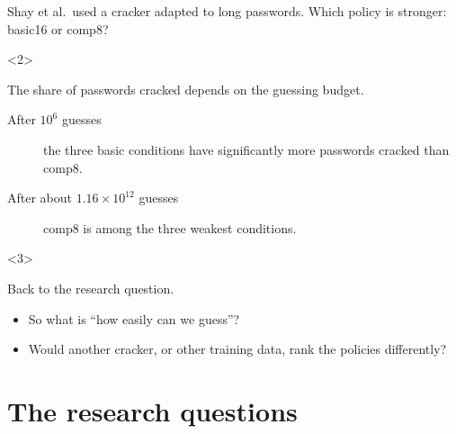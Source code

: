 \begin{frame}
  \begin{question}
    Shay et al.\ used a cracker adapted to long passwords.
    Which policy is stronger: basic16 or comp8?
  \end{question}

  \begin{onlyenv}<2>
    \begin{example}
      The share of passwords cracked depends on the guessing budget.
      \begin{description}
        \item[After $10^6$ guesses] the three basic conditions have
          significantly more passwords cracked than comp8.
        \item[After about $1.16\times 10^{12}$ guesses] comp8 is among the
          three weakest conditions.
      \end{description}
    \end{example}
  \end{onlyenv}

  \begin{onlyenv}<3>
    \begin{question}
      Back to the research question.
      \begin{itemize}
        \item So what is \enquote{how easily can we guess}?
        \item Would another cracker, or other training data, rank the
          policies differently?
      \end{itemize}
    \end{question}
  \end{onlyenv}

\end{frame}

\section{The research questions}

